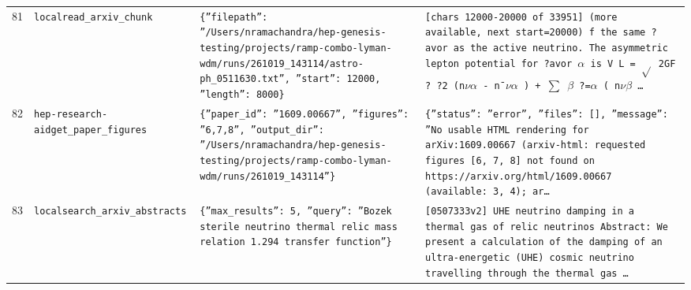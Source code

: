 \documentclass[11pt,a4paper]{article}
\begin{document}
\begin{longtable}{@{}p{}p{}p{}p{}@{}}
81 & \texttt{local}\newline\texttt{read\_\allowbreak{}arxiv\_\allowbreak{}chunk} & \texttt{\{''filepath'':\allowbreak{} ''/\allowbreak{}Users/\allowbreak{}nramachandra/\allowbreak{}hep-genesis-testing/\allowbreak{}projects/\allowbreak{}ramp-combo-lyman-wdm/\allowbreak{}runs/\allowbreak{}261019\_\allowbreak{}143114/\allowbreak{}astro-ph\_\allowbreak{}0511630.txt'',\allowbreak{} ''start'':\allowbreak{} 12000,\allowbreak{} ''length'':\allowbreak{} 8000\}\allowbreak{}} & \texttt{[chars 12000-20000 of 33951]\allowbreak{} (more available,\allowbreak{} next start=\allowbreak{}20000)\allowbreak{}  f the same ?avor as the active neutrino. The asymmetric lepton potential for ?avor $\alpha$ is V L =\allowbreak{} $\sqrt{}\allowbreak{}$ 2GF ? ?2 (n$\nu$$\alpha$ - n¯$\nu$$\alpha$ )\allowbreak{} + $\sum$ $\beta$ ?=\allowbreak{}$\alpha$ ( n$\nu$$\beta$ \ldots{}\allowbreak{}} \\
82 & \texttt{hep-research-aid}\newline\texttt{get\_\allowbreak{}paper\_\allowbreak{}figures} & \texttt{\{''paper\_\allowbreak{}id'':\allowbreak{} ''1609.00667'',\allowbreak{} ''figures'':\allowbreak{} ''6,\allowbreak{}7,\allowbreak{}8'',\allowbreak{} ''output\_\allowbreak{}dir'':\allowbreak{} ''/\allowbreak{}Users/\allowbreak{}nramachandra/\allowbreak{}hep-genesis-testing/\allowbreak{}projects/\allowbreak{}ramp-combo-lyman-wdm/\allowbreak{}runs/\allowbreak{}261019\_\allowbreak{}143114''\}\allowbreak{}} & \texttt{\{''status'':\allowbreak{} ''error'',\allowbreak{} ''files'':\allowbreak{} []\allowbreak{},\allowbreak{} ''message'':\allowbreak{} ''No usable HTML rendering for arXiv:\allowbreak{}1609.00667 (arxiv-html:\allowbreak{} requested figures [6,\allowbreak{} 7,\allowbreak{} 8]\allowbreak{} not found on https:\allowbreak{}/\allowbreak{}/\allowbreak{}arxiv.org/\allowbreak{}html/\allowbreak{}1609.00667 (available:\allowbreak{} 3,\allowbreak{} 4)\allowbreak{};\allowbreak{} ar\ldots{}\allowbreak{}} \\
83 & \texttt{local}\newline\texttt{search\_\allowbreak{}arxiv\_\allowbreak{}abstracts} & \texttt{\{''max\_\allowbreak{}results'':\allowbreak{} 5,\allowbreak{} ''query'':\allowbreak{} ''Bozek sterile neutrino thermal relic mass relation 1.294 transfer function''\}\allowbreak{}} & \texttt{[0507333v2]\allowbreak{} UHE neutrino damping in a thermal gas of relic neutrinos Abstract:\allowbreak{}   We present a calculation of the damping of an ultra-energetic (UHE)\allowbreak{} cosmic neutrino travelling through the thermal gas \ldots{}\allowbreak{}} \\

\end{longtable}
\end{document}
